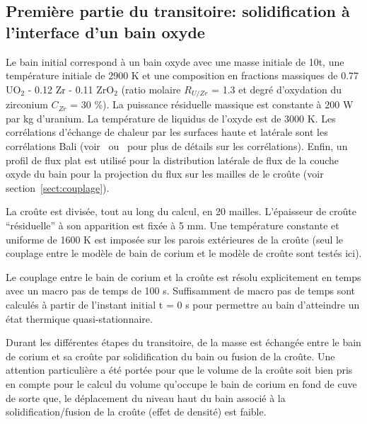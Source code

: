 \subsection{Première partie du transitoire: solidification à l'interface d'un bain oxyde} \label{sect:num1}
Le bain initial correspond à un bain oxyde avec une masse initiale de 10t, une température initiale de 2900 K et une composition en fractions massiques de 0.77 UO$_2$ - 0.12 Zr - 0.11 ZrO$_2$ (ratio molaire $R_{U/Zr}$ = 1.3 et degré  d'oxydation du zirconium $C_{Zr}$ = 30 \%). La puissance résiduelle massique est constante à $200$ W par kg d'uranium. La température de liquidus de l'oxyde est de 3000 K. Les corrélations d'échange de chaleur par les surfaces haute et latérale sont les corrélations Bali (voir~\cite{Bonnet1999} ou~\cite{Tourniaire2009a} pour plus de détails sur les corrélations). Enfin, un profil de flux plat est utilisé pour la distribution latérale de flux de la couche oxyde du bain pour la projection du flux sur les mailles de le croûte (voir section~\ref{sect:couplage}).

La croûte est divisée, tout au long du calcul, en 20 mailles. L'épaisseur de croûte ``résiduelle'' à son apparition est fixée à 5 mm. Une température constante et uniforme de 1600 K est imposée sur les parois extérieures de la croûte (seul le couplage entre le modèle de bain de corium et le modèle de croûte sont testés ici).

Le couplage entre le bain de corium et la croûte est résolu explicitement en temps avec un macro pas de temps de 100 s. Suffisamment de macro pas de temps sont calculés à partir de l'instant initial t = 0 s pour permettre au bain d'atteindre un état thermique quasi-stationnaire.

Durant les différentes étapes du transitoire, de la masse est échangée entre le bain de corium et sa croûte par solidification du bain ou fusion de la croûte. Une attention particulière a été portée pour que le volume de la croûte soit bien pris en compte pour le calcul du volume qu'occupe le bain de corium en fond de cuve de sorte que, le déplacement du niveau haut du bain associé à la solidification/fusion de la croûte (effet de densité) est faible.

